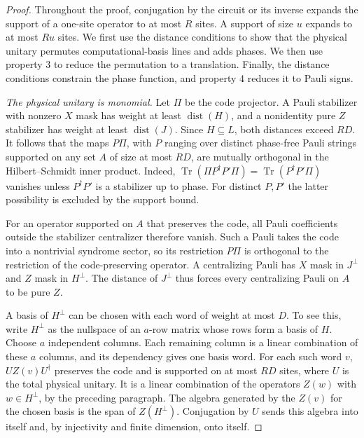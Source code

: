 \documentclass[aps,prl,reprint,notitlepage,nofootinbib,nobibnotes]{revtex4-2}
\begin{document}
\begin{proof}
Throughout the proof, conjugation by the circuit or its inverse expands the support of a one-site
operator to at most $R$ sites. A support of size $u$ expands to at most $Ru$ sites. We first use
the distance conditions to show that the physical unitary permutes computational-basis lines and
adds phases. We then use property 3 to reduce the permutation to a translation. Finally, the
distance conditions constrain the phase function, and property 4 reduces it to Pauli signs.

\emph{The physical unitary is monomial.}
Let $\Pi$ be the code projector. A Pauli stabilizer with nonzero $X$ mask has weight at least
$\operatorname{dist}(H)$, and a nonidentity pure $Z$ stabilizer has weight at least
$\operatorname{dist}(J)$. Since $H\subseteq L$, both distances exceed $RD$. It follows that the
maps $P\Pi$, with $P$ ranging over distinct phase-free Pauli strings supported on any set $A$ of
size at most $RD$, are mutually orthogonal in the Hilbert--Schmidt inner product. Indeed,
$\operatorname{Tr}(\Pi P^\dagger P'\Pi)=\operatorname{Tr}(P^\dagger P'\Pi)$ vanishes unless
$P^\dagger P'$ is a stabilizer up to phase. For distinct $P,P'$ the latter possibility is excluded
by the support bound.

For an operator supported on $A$ that preserves the code, all Pauli coefficients outside the
stabilizer centralizer therefore vanish. Such a Pauli takes the code into a nontrivial syndrome
sector, so its restriction $P\Pi$ is orthogonal to the restriction of the code-preserving operator.
A centralizing Pauli has $X$ mask in $J^\perp$ and $Z$ mask in $H^\perp$. The distance of $J^\perp$
thus forces every centralizing Pauli on $A$ to be pure $Z$.

A basis of $H^\perp$ can be chosen with each word of weight at most $D$. To see this, write
$H^\perp$ as the nullspace of an $a$-row matrix whose rows form a basis of $H$. Choose $a$
independent columns. Each remaining column is a linear combination of these $a$ columns, and its
dependency gives one basis word. For each such word $v$, $UZ(v)U^\dagger$ preserves the code and is
supported on at most $RD$ sites, where $U$ is the total physical unitary. It is a linear
combination of the operators $Z(w)$ with $w\in H^\perp$, by the preceding paragraph. The algebra
generated by the $Z(v)$ for the chosen basis is the span of $Z(H^\perp)$. Conjugation by $U$ sends
this algebra into itself and, by injectivity and finite dimension, onto itself.


\end{proof}
\end{document}
